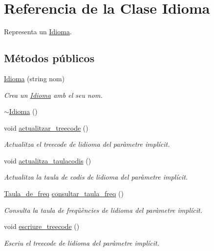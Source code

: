 \hypertarget{class_idioma}{}\section{Referencia de la Clase Idioma}
\label{class_idioma}


Representa un \hyperlink{class_idioma}{Idioma}.  


\subsection*{Métodos públicos}
\begin{DoxyCompactItemize}
\item 
\hyperlink{class_idioma_acb367feda82c466b5c61378636b901b6}{Idioma} (string nom)
\begin{DoxyCompactList}\small\item\em Crea un \hyperlink{class_idioma}{Idioma} amb el seu nom. \end{DoxyCompactList}\item 
\hyperlink{class_idioma_a80c90f8c9a7f824d7d7d171b9face201}{$\sim$\+Idioma} ()
\item 
void \hyperlink{class_idioma_a227386152fe1be34cd3a0a7fce4c4c95}{actualitzar\+\_\+treecode} ()
\begin{DoxyCompactList}\small\item\em Actualitza el treecode de l\textquotesingle{}idioma del paràmetre implícit. \end{DoxyCompactList}\item 
void \hyperlink{class_idioma_ac089a0e4b79ca8f3df040e204a3de7dd}{actualitza\+\_\+taulacodis} ()
\begin{DoxyCompactList}\small\item\em Actualitza la taula de codis de l\textquotesingle{}idioma del paràmetre implícit. \end{DoxyCompactList}\item 
\hyperlink{class_taula__de__freq}{Taula\+\_\+de\+\_\+freq} \hyperlink{class_idioma_a3d06a9d14291a5b59e0de1a65512ed80}{consultar\+\_\+taula\+\_\+freq} ()
\begin{DoxyCompactList}\small\item\em Consulta la taula de freqüències de l\textquotesingle{}idioma del paràmetre implícit. \end{DoxyCompactList}\item 
void \hyperlink{class_idioma_a2c3024b18da125926668a2df2b178992}{escriure\+\_\+treecode} ()
\begin{DoxyCompactList}\small\item\em Escriu el treecode de l\textquotesingle{}idioma del paràmetre implícit. \end{DoxyCompactList}\item 

\end{DoxyCompactItemize}
